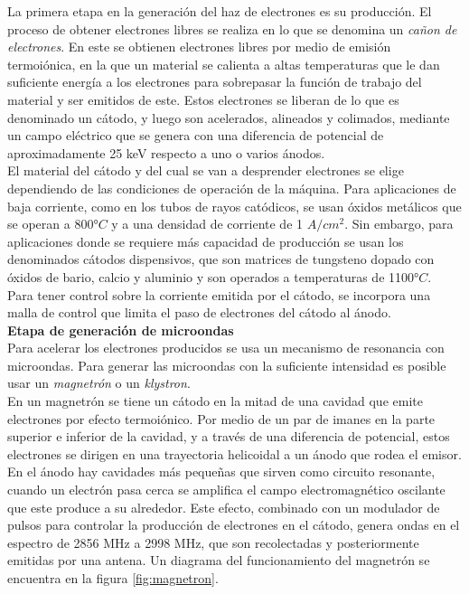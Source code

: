 La primera etapa en la generación del haz de electrones es su producción. El proceso de obtener electrones libres se realiza en lo que se denomina un \textit{cañon de electrones}. En este se obtienen electrones libres por medio de emisión termoiónica, en la que un material se calienta a altas temperaturas que le dan suficiente energía a los electrones para sobrepasar la función de trabajo del material y ser emitidos de este. Estos electrones se liberan de lo que es denominado un cátodo, y luego son acelerados, alineados y colimados, mediante un campo eléctrico que se genera con una diferencia de potencial de aproximadamente 25 keV respecto a uno o varios ánodos.\\

El material del cátodo y del cual se van a desprender electrones se elige dependiendo de las condiciones de operación de la máquina. Para aplicaciones de baja corriente, como en los tubos de rayos catódicos, se usan óxidos metálicos que se operan a 800°$C$ y a una densidad de corriente de 1 $A/cm^2$. Sin embargo, para aplicaciones donde se requiere más capacidad de producción se usan los denominados cátodos dispensivos, que son matrices de tungsteno dopado con óxidos de bario, calcio y aluminio y son operados a temperaturas de 1100°$C$.\\ 

Para tener control sobre la corriente emitida por el cátodo, se incorpora una malla de control que limita el paso de electrones del cátodo al ánodo.\\

\textbf{Etapa de generación de microondas}\\

Para acelerar los electrones producidos se usa un mecanismo de resonancia con microondas. Para generar las microondas con la suficiente intensidad es posible usar un \textit{magnetrón} o un \textit{klystron}.\\

En un magnetrón se tiene un cátodo en la mitad de una cavidad que emite electrones por efecto termoiónico. Por medio de un par de imanes en la parte superior e inferior de la cavidad, y a través de una diferencia de potencial, estos electrones se dirigen en una trayectoria helicoidal a un ánodo que rodea el emisor. En el ánodo hay cavidades más pequeñas que sirven como circuito resonante, cuando un electrón pasa cerca se amplifica el campo electromagnético oscilante que este produce a su alrededor. Este efecto, combinado con un modulador de pulsos para controlar la producción de electrones en el cátodo, genera ondas en el espectro de 2856 MHz a 2998 MHz, que son recolectadas y posteriormente emitidas por una antena. Un diagrama del funcionamiento del magnetrón se encuentra en la figura \ref{fig:magnetron}.\\

